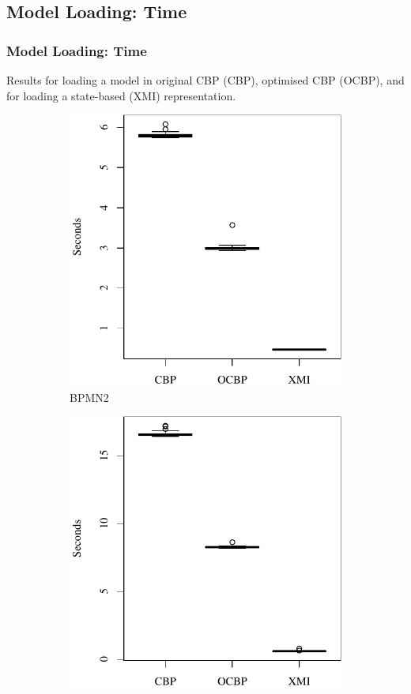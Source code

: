 \documentclass{beamer}
\begin{document}
\begin{frame}[fragile]
\section{Model Loading: Time}
\frametitle{Model Loading: Time}
Results for loading a model in original CBP (CBP), optimised CBP (OCBP), and for loading a state-based (XMI) representation.
\begin{figure}[ht]
    \begin{subfigure}{0.325\textwidth}
        \centering
        \includegraphics[width=\linewidth]{load_time_bpmn2}
        \caption{BPMN2}
        \label{fig:load_time_bpmn2}
    \end{subfigure}
    \hfill
    \begin{subfigure}{0.325\textwidth}
        \centering
        \includegraphics[width=\linewidth]{load_time_epsilon}

\end{subfigure}
\end{figure}
\end{frame}
\end{document}

